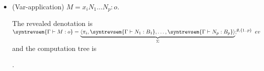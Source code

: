 \begin{itemize}[$\bullet$]
\begin{enumerate}
\begin{itemize}
    By definition, the function $\varphi_{M}$ maps nodes from the subtree of $\tau(M)$ rooted at $\theroot_{k'}$, for any $k'\in \{0..p\}$, to moves of the game $\syntrevsem{\Gamma \vdash B_{k'}}$ that are hereditarily justified by some occurrence of $\varphi_M(\theroot_{k'})$.
    Hence for any $k'\in \{0..p\}\setminus\{k\}$ we clearly have $\varphi_{M}(t^\star) \filter T^{0k'} \filter b = \epsilon$.
    Moreover:
    \begin{align*}
        u \filter T^{0k}\filter b &= \varphi_{M}(t^\star) \filter T^{0k}\filter b \\
         &= \varphi_{M}(t^\star \filter V^{(\theroot_k)} \filter r_k ) & \mbox{by Lemma \ref{lem:varphi_proj}(i)} \\
         &= \varphi_{M}((t\filterplus r_k)^\star) & \mbox{by Lemma \ref{lem:tstarproj_eq_tprojplusstar}} \\
         &= \varphi_{N_k}((t\filterplus r_k)^\star) & \mbox{since $t\filterplus r_k$ is a traversal of $N_k$ by Prop.\ \ref{prop:trav_projection}} \\
         &\in \varphi_{N_k}(\travset(N_k)^\star) \\
         &\quad = \syntrevsem{N_k} & \mbox{by the induction hypothesis.}
    \end{align*}
    \item  Finally we can show that $\varphi_{M}(t^\star) \filter B_0 = \varphi_{M}(t^\star) \filter B_1, \ldots, B_p, C$ by a trivial induction on the traversal $t$. (This property holds thanks to the copycat traversal rules which mimic the behaviour of the evaluation strategy).
    \end{itemize}

\end{enumerate}


    \item (Var-application) $M = x_i N_1 \ldots N_p :o$.

    The revealed denotation is
    $\syntrevsem{\Gamma \vdash M : o} =  \underbrace{\langle
            \pi_i, \syntrevsem{\Gamma \vdash N_1 : B_1}, \ldots,
            \syntrevsem{\Gamma \vdash N_p : B_p} \rangle}_{\Sigma}
            ;^{\emptyset,\{1..p\}} \ ev$
    and the computation tree is
{\begin{center}
\end{center}
   }.


\end{itemize}
